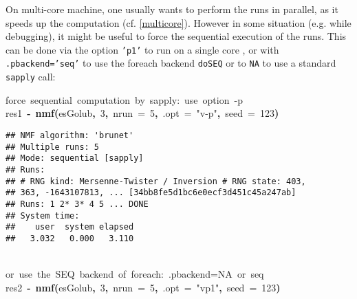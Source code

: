 \documentclass[a4paper]{article}\usepackage{graphicx, color}
\makeatletter
\newcommand{\hlnumber}[1]{\textcolor[rgb]{0,0,0}{#1}}%
\newcommand{\hlfunctioncall}[1]{\textcolor[rgb]{0.501960784313725,0,0.329411764705882}{\textbf{#1}}}%
\newcommand{\hlstring}[1]{\textcolor[rgb]{0.6,0.6,1}{#1}}%
\newcommand{\hlkeyword}[1]{\textcolor[rgb]{0,0,0}{\textbf{#1}}}%
\newcommand{\hlargument}[1]{\textcolor[rgb]{0.690196078431373,0.250980392156863,0.0196078431372549}{#1}}%
\newcommand{\hlcomment}[1]{\textcolor[rgb]{0.180392156862745,0.6,0.341176470588235}{#1}}%
\newcommand{\hlassignement}[1]{\textcolor[rgb]{0,0,0}{\textbf{#1}}}%
\newcommand{\hlsymbol}[1]{\textcolor[rgb]{0,0,0}{#1}}%
\newcommand{\hlstd}[1]{\textcolor[rgb]{0,0,0}{#1}}%
\newenvironment{kframe}{%
 \def\FrameCommand##1{\hskip\@totalleftmargin \hskip-\fboxsep
 \colorbox{shadecolor}{##1}\hskip-\fboxsep
     \hskip-\linewidth \hskip-\@totalleftmargin \hskip\columnwidth}%
 \MakeFramed {\advance\hsize-\width
   \@totalleftmargin\z@ \linewidth\hsize
   \@setminipage}}%
 {\par\unskip\endMakeFramed}
\newenvironment{knitrout}{}{} %
\let\code=\texttt
\makeatother
\begin{document}
On multi-core machine, one usually wants to perform the runs in parallel, as it speeds up the computation (cf. \cref{multicore}).
However in some situation (e.g. while debugging), it might be useful to force the sequential execution of the runs. 
This can be done via the option \code{'p1'} to run on a single core , or with
\code{.pbackend='seq'} to use the foreach backend \code{doSEQ} or to \code{NA} to use a standard \code{sapply} call:

\begin{knitrout}
\color{fgcolor}\begin{kframe}
\begin{flushleft}
\ttfamily\noindent
\hlcomment{\usebox{\hlnormalsizeboxhash}{\ }force{\ }sequential{\ }computation{\ }by{\ }sapply:{\ }use{\ }option{\ }\usebox{\hlnormalsizeboxsinglequote}-p\usebox{\hlnormalsizeboxsinglequote}}\hspace*{\fill}\\
\hlstd{}\hlsymbol{res1}{\ }\hlassignement{\usebox{\hlnormalsizeboxlessthan}-}{\ }\hlfunctioncall{nmf}\hlkeyword{(}\hlsymbol{esGolub}\hlkeyword{,}{\ }\hlnumber{3}\hlkeyword{,}{\ }\hlargument{nrun}{\ }\hlargument{=}{\ }\hlnumber{5}\hlkeyword{,}{\ }\hlargument{.opt}{\ }\hlargument{=}{\ }\hlstring{"{}v-p"{}}\hlkeyword{,}{\ }\hlargument{seed}{\ }\hlargument{=}{\ }\hlnumber{123}\hlkeyword{)}\mbox{}
\normalfont
\end{flushleft}
\begin{verbatim}
## NMF algorithm: 'brunet'
## Multiple runs: 5
## Mode: sequential [sapply]
## Runs:
## # RNG kind: Mersenne-Twister / Inversion # RNG state: 403,
## 363, -1643107813, ... [34bb8fe5d1bc6e0ecf3d451c45a247ab]
## Runs: 1 2* 3* 4 5 ... DONE
## System time:
##    user  system elapsed 
##   3.032   0.000   3.110 
\end{verbatim}
\begin{flushleft}
\ttfamily\noindent
\hspace*{\fill}\\
\hlstd{}\hlcomment{\usebox{\hlnormalsizeboxhash}{\ }or{\ }use{\ }the{\ }SEQ{\ }backend{\ }of{\ }foreach:{\ }.pbackend=NA{\ }or{\ }\usebox{\hlnormalsizeboxsinglequote}seq\usebox{\hlnormalsizeboxsinglequote}}\hspace*{\fill}\\
\hlstd{}\hlsymbol{res2}{\ }\hlassignement{\usebox{\hlnormalsizeboxlessthan}-}{\ }\hlfunctioncall{nmf}\hlkeyword{(}\hlsymbol{esGolub}\hlkeyword{,}{\ }\hlnumber{3}\hlkeyword{,}{\ }\hlargument{nrun}{\ }\hlargument{=}{\ }\hlnumber{5}\hlkeyword{,}{\ }\hlargument{.opt}{\ }\hlargument{=}{\ }\hlstring{"{}vp1"{}}\hlkeyword{,}{\ }\hlargument{seed}{\ }\hlargument{=}{\ }\hlnumber{123}\hlkeyword{)}\mbox{}

\end{flushleft}
\end{kframe}
\end{knitrout}
\end{document}

